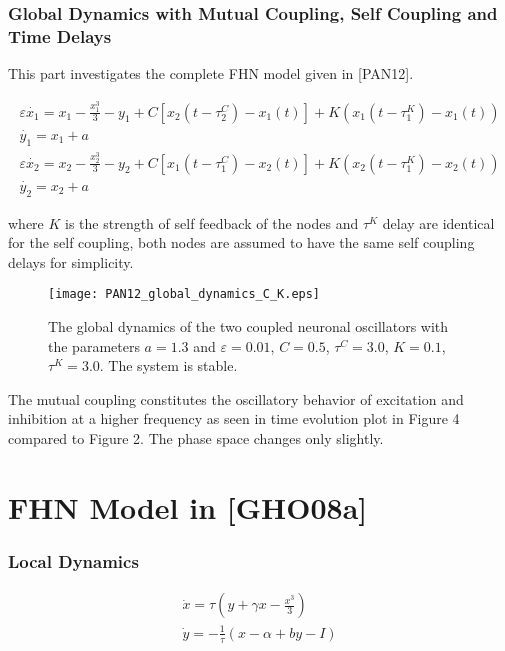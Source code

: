 \documentclass[12pt]{article}
\begin{document}
\subsubsection{Global Dynamics with Mutual Coupling, Self Coupling and Time Delays}

This part investigates the complete FHN model given in [PAN12].

\begin{subequations} \begin{align} \varepsilon  \dot{x_1} = x_1 - \frac{x_1^3}{3} -y_1  + C [x_2(t-\tau_2^C)-x_1(t)] + K(x_1(t-\tau_1^K) - x_1(t)) \label{eqn: frobenius 14}\\  \dot{y_1} = x_1+a \label{eqn: frobenius 15}  \\ \varepsilon  \dot{x_2} = x_2 - \frac{x_2^3}{3} -y_2  + C [x_1(t-\tau_1^C)-x_2(t)] + K(x_2(t-\tau_1^K) - x_2(t)) \label{eqn: frobenius 16}  \\  \dot{y_2} = x_2+a \label{eqn: frobenius 17} 
\end{align} 
\end{subequations}

where $K$ is the strength of self feedback of the nodes and $\tau^K$ delay are identical for the self coupling, both nodes are assumed to have the same self coupling delays for simplicity.

\begin{figure}[h!]
	\centering
	\texttt{[image: PAN12\_global\_dynamics\_C\_K.eps]}
		\caption{The global dynamics of the two coupled neuronal oscillators with the parameters $a=1.3$ and $\varepsilon = 0.01$, $C=0.5$, $\tau^C= 3.0$, $K=0.1$, $\tau^K= 3.0$. The system is stable. }
\end{figure}

The mutual coupling constitutes the oscillatory behavior of excitation and inhibition at a higher frequency as seen in time evolution plot in Figure 4 compared to Figure 2. The phase space changes only slightly.


\section{FHN Model in [GHO08a]}

\subsubsection{Local Dynamics}

\begin{subequations}
 \begin{align}\dot{x} = \tau (y + \gamma x - \frac{x^3}{3})  \label{eqn: frobenius 17}\\  \dot{y} = -\frac{1}{\tau} (x - \alpha + b y - I ) \label{eqn: frobenius 18}   \end{align} 
\end{subequations}
\end{document}

